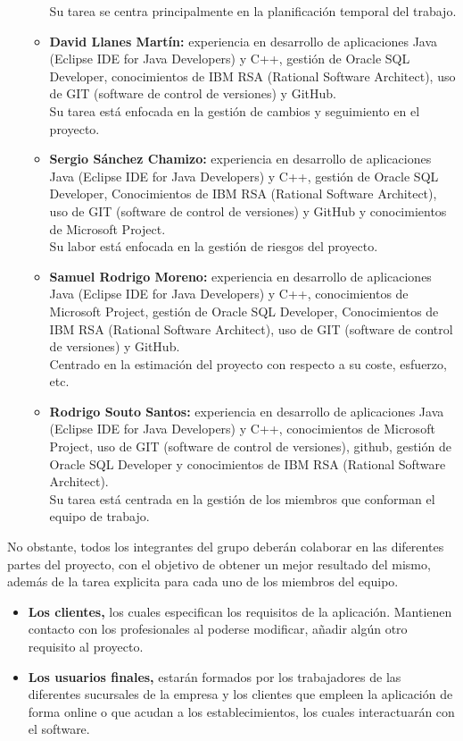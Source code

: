 \begin{itemize}
\begin{itemize}
		            Su tarea se centra principalmente en la planificación temporal del trabajo.
		      \item\textbf{David Llanes Martín:} experiencia en desarrollo de aplicaciones Java (Eclipse IDE for Java Developers) y C++, gestión de Oracle SQL Developer, conocimientos de IBM RSA (Rational Software Architect), uso de GIT (software de control de versiones) y GitHub. \\
		            Su tarea está enfocada en la gestión de cambios y seguimiento en el proyecto.
		      \item\textbf{Sergio Sánchez Chamizo:} experiencia en desarrollo de aplicaciones Java (Eclipse IDE for Java Developers) y C++, gestión de Oracle SQL Developer, Conocimientos de IBM RSA (Rational Software Architect), uso de GIT (software de control de versiones) y GitHub y conocimientos de Microsoft Project.\\
		            Su labor está enfocada en la gestión de riesgos del proyecto.
		      \item\textbf{Samuel Rodrigo Moreno:} experiencia en desarrollo de aplicaciones Java (Eclipse IDE for Java Developers) y C++, conocimientos de Microsoft Project, gestión de Oracle SQL Developer, Conocimientos de IBM RSA (Rational Software Architect), uso de GIT (software de control de versiones) y GitHub.\\
		            Centrado en la estimación del proyecto con respecto a su coste, esfuerzo, etc.
		      \item\textbf{Rodrigo Souto Santos:} experiencia en desarrollo de aplicaciones Java (Eclipse IDE for Java Developers) y C++, conocimientos de Microsoft Project, uso de GIT (software de control de versiones), github, gestión de Oracle SQL Developer y conocimientos de IBM RSA (Rational Software Architect). \\
		            Su tarea está centrada en la gestión de los miembros que conforman el equipo de trabajo.
	      \end{itemize}
\end{itemize}

No obstante, todos los integrantes del grupo deberán colaborar en las diferentes partes del proyecto, con el objetivo de obtener un mejor resultado del mismo, además de la tarea explicita para cada uno de los miembros del equipo.

\begin{itemize}
	\item\textbf{Los clientes,} los cuales especifican los requisitos de la aplicación. Mantienen contacto con los profesionales al poderse modificar, añadir algún otro requisito al proyecto.
	\item\textbf{Los usuarios finales, }estarán formados por los trabajadores de las diferentes sucursales de la empresa y los clientes que empleen la aplicación de forma online o que acudan a los establecimientos, los cuales interactuarán con el software.
\end{itemize}
